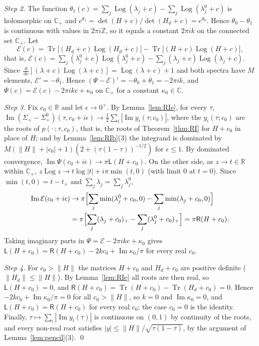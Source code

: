 \documentclass[11pt]{amsart}
\theoremstyle{definition}
\theoremstyle{remark}
\numberwithin{equation}{section}
\newcommand{\Z}{\mathbb{Z}}
\newcommand{\R}{\mathbb{R}}
\newcommand{\C}{\mathbb{C}}
\newcommand{\Tr}{\operatorname{Tr}}
\renewcommand{\Im}{\operatorname{Im}}
\newcommand{\dd}{\,\mathrm{d}}
\begin{document}
\emph{Step 2.} The function $\theta_1(c)=\sum_j\operatorname{Log}(\lambda_j+c)-\sum_j\operatorname{Log}(\lambda^0_j+c)$ is
holomorphic on $\C_+$ and $e^{\theta_1}=\det(H+c)/\det(H_d+c)=e^{\theta_0}$. Hence $\theta_0-\theta_1$ is continuous with values
in $2\pi i\Z$, so it equals a constant $2\pi ik$ on the connected set $\C_+$. Let
\[
\mathcal E(c)=\Tr\bigl[(H_d+c)\operatorname{Log}(H_d+c)\bigr]-\Tr\bigl[(H+c)\operatorname{Log}(H+c)\bigr],
\]
that is, $\mathcal E(c)=\sum_j(\lambda^0_j+c)\operatorname{Log}(\lambda^0_j+c)-\sum_j(\lambda_j+c)\operatorname{Log}(\lambda_j+c)$.
Since $\frac{\dd}{\dd c}[(\lambda+c)\operatorname{Log}(\lambda+c)]=\operatorname{Log}(\lambda+c)+1$ and both spectra have $M$
elements, $\mathcal E'=-\theta_1$. Hence $(\Psi-\mathcal E)'=-\theta_0+\theta_1=-2\pi ik$, and
$\Psi(c)=\mathcal E(c)-2\pi ikc+\kappa_0$ on $\C_+$ for a constant $\kappa_0\in\C$.

\emph{Step 3.} Fix $c_0\in\R$ and let $\epsilon\to0^+$. By Lemma~\ref{lem:RIe}, for every $\tau$,
$\Im(\Sigma_+-\Sigma^0_+)(\tau,c_0+i\epsilon)\to\frac12\sum_i|\Im y_i(\tau;c_0)|$, where the $y_i(\tau;c_0)$ are the roots of
$p(\cdot\,;\tau,c_0)$, that is, the roots of Theorem~\ref{thm:RI} for $H+c_0$ in place of $H$; and by Lemma~\ref{lem:RIb}(3)
the integrand is dominated by $M(\|H\|+|c_0|+1)(2+(\tau(1-\tau))^{-1/2})$ for $\epsilon\le1$. By dominated convergence,
$\Im\Psi(c_0+i\epsilon)\to\pi\mathsf L(H+c_0)$. On the other side, as $z\to t\in\R$ within $\C_+$,
$z\operatorname{Log}z\to t\log|t|+i\pi\min(t,0)$ (with limit $0$ at $t=0$). Since $\min(t,0)=t-t_+$ and
$\sum_j\lambda_j=\sum_j\lambda^0_j$,
\begin{align*}
\Im\mathcal E(c_0+i\epsilon)&\to\pi\Bigl[\sum_j\min(\lambda^0_j+c_0,0)-\sum_j\min(\lambda_j+c_0,0)\Bigr]\\
&=\pi\Bigl[\sum_j(\lambda_j+c_0)_+-\sum_j(\lambda^0_j+c_0)_+\Bigr]=\pi\mathsf R(H+c_0).
\end{align*}
Taking imaginary parts in $\Psi=\mathcal E-2\pi ikc+\kappa_0$ gives
$\mathsf L(H+c_0)=\mathsf R(H+c_0)-2kc_0+\Im\kappa_0/\pi$ for every real $c_0$.

\emph{Step 4.} For $c_0>\|H\|$ the matrices $H+c_0$ and $H_d+c_0$ are positive definite ($\|H_d\|\le\|H\|$). By
Lemma~\ref{lem:RIe} all roots are then real, so $\mathsf L(H+c_0)=0$, and $\mathsf R(H+c_0)=\Tr(H+c_0)-\Tr(H_d+c_0)=0$.
Hence $-2kc_0+\Im\kappa_0/\pi=0$ for all $c_0>\|H\|$, so $k=0$ and $\Im\kappa_0=0$, and $\mathsf L(H+c_0)=\mathsf R(H+c_0)$ for
every real $c_0$; the case $c_0=0$ is the identity. Finally, $\tau\mapsto\sum_i|\Im y_i(\tau)|$ is continuous on $(0,1)$ by
continuity of the roots, and every non-real root satisfies $|y|\le\|H\|/\sqrt{\tau(1-\tau)}$, by the argument of
Lemma~\ref{lem:pencil}(3). \qed
\end{document}
